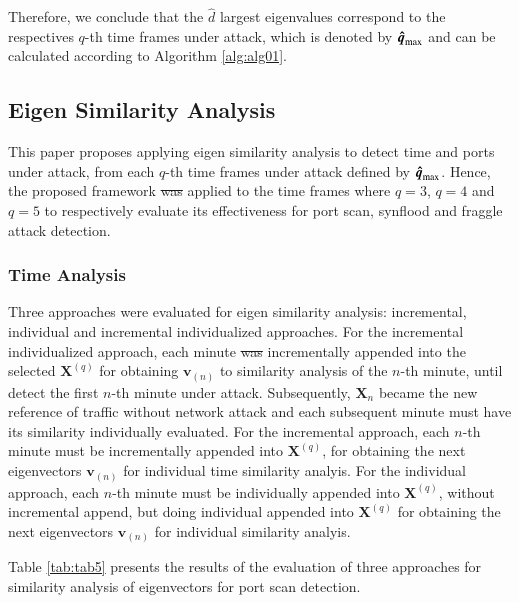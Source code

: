 \documentclass[review]{elsarticle}
\providecommand{\DIFaddtex}[1]{{\protect\color{blue}\uwave{#1}}} %
\providecommand{\DIFdeltex}[1]{{\protect\color{red}\sout{#1}}}                      %
\providecommand{\DIFaddbegin}{} %
\providecommand{\DIFaddend}{} %
\providecommand{\DIFdelbegin}{} %
\providecommand{\DIFdelend}{} %
\providecommand{\DIFadd}[1]{\texorpdfstring{\DIFaddtex{#1}}{#1}} %
\providecommand{\DIFdel}[1]{\texorpdfstring{\DIFdeltex{#1}}{}} %
\begin{document}
Therefore, we conclude that the $\hat{d}$ largest eigenvalues correspond to the respectives $q$-th time frames under attack, which is denoted by $\rm{\boldsymbol{\hat{q}}}_{\rm max}$ and can be calculated according to Algorithm \ref{alg:alg01}.

\subsection{Eigen Similarity Analysis}
\label{sec:EigenSimilarityAnalysis}

This paper proposes applying eigen similarity analysis to detect time and ports under attack, from each $q$-th time frames under attack defined by $\rm{\boldsymbol{\hat{q}}}_{\rm max}$. Hence, the proposed framework \DIFdelbegin \DIFdel{was }\DIFdelend \DIFaddbegin \DIFadd{is }\DIFaddend applied to the time frames where $q=3$, $q=4$ and $q=5$ to respectively evaluate its effectiveness for port scan, synflood and fraggle attack detection.

\subsubsection{Time Analysis}
\label{sec:TimeAnalysis}

Three approaches were evaluated for eigen similarity analysis: incremental, individual and incremental individualized approaches. For the incremental individualized approach, each minute \DIFdelbegin \DIFdel{was }\DIFdelend \DIFaddbegin \DIFadd{is }\DIFaddend incrementally appended into the selected $\boldsymbol{X}^{(q)}$ for obtaining $\boldsymbol{v}_{(n)}$ to similarity analysis of the $n$-th minute, until detect the first $n$-th minute under attack. Subsequently, $\boldsymbol{X}_n$ became the new reference of traffic without network attack and each subsequent minute must have its similarity individually evaluated. For the incremental approach, each $n$-th minute must be incrementally appended into $\boldsymbol{X}^{(q)}$, for obtaining the next eigenvectors $\boldsymbol{v}_{(n)}$ for individual time similarity analyis. For the individual approach, each $n$-th minute must be individually appended into $\boldsymbol{X}^{(q)}$, without incremental append, but doing individual appended into $\boldsymbol{X}^{(q)}$ for obtaining the next eigenvectors $\boldsymbol{v}_{(n)}$ for individual similarity analyis.

Table \ref{tab:tab5} presents the results of the evaluation of three approaches for similarity analysis of eigenvectors for port scan detection.
\end{document}
